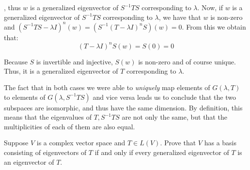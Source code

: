 \begin{solution}
    , thus $w$ is a generalized eigenvector of $S^{-1}TS$ corresponding to $\lambda$. Now, if $w$ is a generalized eigenvector of $S^{-1}TS$ corresponding to $\lambda$, we have that $w$ is non-zero and $(S^{-1}TS - \lambda I)^n(w) = (S^{-1}(T - \lambda I)^nS) (w) = 0$. From this we obtain that:
    $$(T-\lambda I)^nS(w) = S(0) = 0$$

    Because $S$ is invertible and injective, $S(w)$ is non-zero and of course unique. Thus, it is a generalized eigenvector of $T$ corresponding to $\lambda$.

    The fact that in both cases we were able to \textit{uniquely} map elements of $G(\lambda, T)$ to elements of $G(\lambda, S^{-1}TS)$ and vice versa leads us to conclude that the two subspaces are isomorphic, and thus have the same dimension. By definition, this means that the eigenvalues of $T, S^{-1}TS$ are not only the same, but that the multiplicities of each of them are also equal.
\end{solution}

\begin{exercise}{5}
    Suppose $V$ is a complex vector space and $T \in L(V)$. Prove that $V$ has a basis consisting of eigenvectors of $T$ if and only if every generalized eigenvector of $T$ is an eigenvector of $T$.
\end{exercise}

